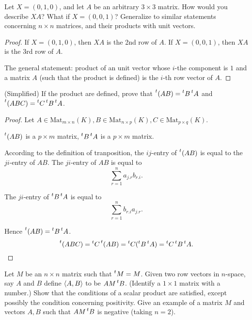 \begin{exercise}
    Let $X = (0, 1, 0)$, and let $A$ be an arbitrary $3\times 3$ matrix. How would you describe $XA$? What if $X = (0, 0, 1)$? Generalize to similar statements concerning $n\times n$ matrices, and their products with unit vectors.
\end{exercise}

\begin{proof}
    If $X = (0, 1, 0)$, then $XA$ is the 2nd row of $A$. If $X = (0, 0, 1)$, then $XA$ is the 3rd row of $A$.

    The general statement: product of an unit vector whose $i$-the component is $1$ and a matrix $A$ (such that the product is defined) is the $i$-th row vector of $A$.
\end{proof}

\begin{exercise}
    (Simplified) If the product are defined, prove that $\prescript{t}{}{(AB)} = \prescript{t}{}{B}\prescript{t}{}{A}$ and $\prescript{t}{}{(ABC)} = \prescript{t}{}{C}\prescript{t}{}{B}\prescript{t}{}{A}$.
\end{exercise}

\begin{proof}
    Let $A\in\text{Mat}_{m\times n}(K), B\in\text{Mat}_{n\times p}(K), C\in\text{Mat}_{p\times q}(K)$.

    $\prescript{t}{}{(AB)}$ is a $p\times m$ matrix, $\prescript{t}{}{B}\prescript{t}{}{A}$ is a $p\times m$ matrix.

    According to the definition of tranposition, the $ij$-entry of $\prescript{t}{}{(AB)}$ is equal to the $ji$-entry of $AB$. The $ji$-entry of $AB$ is equal to
    \[
        \sum^{n}_{r=1}a_{j.r}b_{r.i}.
    \]

    The $ji$-entry of $\prescript{t}{}{B}\prescript{t}{}{A}$ is equal to
    \[
        \sum^{n}_{r=1}b_{r.i}a_{j.r}.
    \]

    Hence $\prescript{t}{}{(AB)} = \prescript{t}{}{B}\prescript{t}{}{A}$.
    \[
        \prescript{t}{}{(ABC)} = \prescript{t}{}{C}\prescript{t}{}{(AB)} = \prescript{t}{}{C}(\prescript{t}{}{B}\prescript{t}{}{A}) = \prescript{t}{}{C}\prescript{t}{}{B}\prescript{t}{}{A}.
    \]
\end{proof}

\begin{exercise}
    Let $M$ be an $n\times n$ matrix such that $\prescript{t}{}{M} = M$. Given two row vectors in $n$-space, say $A$ and $B$ define $\left\langle{A, B}\right\rangle$ to be $AM\prescript{t}{}{B}$. (Identify a $1\times 1$ matrix with a number.) Show that the conditions of a scalar product are satisfied, except possibly the condition concerning positivity. Give an example of a matrix $M$ and vectors $A, B$ such that $AM\prescript{t}{}{B}$ is negative (taking $n = 2$).
\end{exercise}

